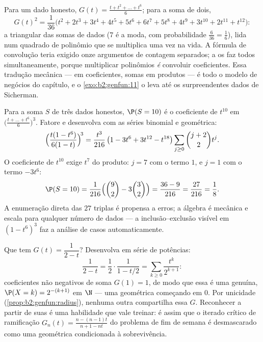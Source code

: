 \begin{example}\label{ex:b2:genfun:twodice}
Para um dado honesto, $G(t) = \frac{t + t^2 + \dots + t^6}{6}$;
para a soma de dois,
\[
G(t)^2 = \frac{1}{36}\bigl(t^2 + 2t^3 + 3t^4 + 4t^5 + 5t^6 +
6t^7 + 5t^8 + 4t^9 + 3t^{10} + 2t^{11} + t^{12}\bigr) :
\]
a  triangular das somas de dados ($7$ é a moda, com
probabilidade $\frac6{36} = \frac16$), lida num quadrado de
polinômio que se multiplica uma vez na vida. A
fórmula de convolução teria exigido onze argumentos de
contagem separados; a  os faz todos
simultaneamente, porque multiplicar polinômios \emph{é}
convoluir coeficientes. Essa tradução mecânica ---
 em coeficientes, somas em produtos --- é todo o
modelo de negócios do capítulo, e o
\cref{exo:b2:genfun:11} o leva até os surpreendentes
dados de Sicherman.
\end{example}

\begin{example}\label{ex:b2:genfun:threedice}
Para a soma $S$ de três dados honestos, $\P(S = 10)$ é o
coeficiente de $t^{10}$ em $\bigl(\frac{t + \dots +
t^6}6\bigr)^3$. Fatore e desenvolva com as séries binomial e
geométrica:
\[
\Bigl(\frac{t(1 - t^6)}{6(1 - t)}\Bigr)^{\!3}
= \frac{t^3}{216}\,\bigl(1 - 3t^6 + 3t^{12} -
t^{18}\bigr)\sum_{j\geq0}\binom{j+2}2t^j .
\]
O coeficiente de $t^{10}$ exige $t^7$ do produto:
$j = 7$ com o termo $1$, e $j = 1$ com o termo
$-3t^6$:
\[
\P(S = 10) = \frac{1}{216}\Bigl(\binom92 -
3\binom32\Bigr) = \frac{36 - 9}{216} = \frac{27}{216} =
\frac18 .
\]
A enumeração direta das $27$ triplas é propensa a erros; a
álgebra é mecânica e escala para qualquer número de dados ---
a inclusão--exclusão visível em $(1 - t^6)^3$ faz
a análise de casos automaticamente.
\end{example}

\begin{example}\label{ex:b2:genfun:identify}
Que  tem $G(t) = \dfrac1{2 - t}$? Desenvolva em série
de potências:
\[
\frac{1}{2 - t} = \frac12\cdot\frac1{1 - t/2}
= \sum_{k\geq0}\frac{t^k}{2^{k+1}} :
\]
coeficientes não negativos de soma $G(1) = 1$, de modo que essa é uma
 genuína, $\P(X = k) = 2^{-(k+1)}$ em $\N$ --- uma
 geométrica começando em $0$. Por unicidade
(\cref{prop:b2:genfun:radius}), nenhuma outra  compartilha essa
$G$. Reconhecer  a partir de suas  é uma
habilidade que vale treinar: é assim que o iterado crítico de
ramificação $G_n(t) = \frac{n - (n-1)t}{n+1 - nt}$ do
problema de fim de semana é desmascarado como uma  geométrica condicionada
à sobrevivência.
\end{example}

